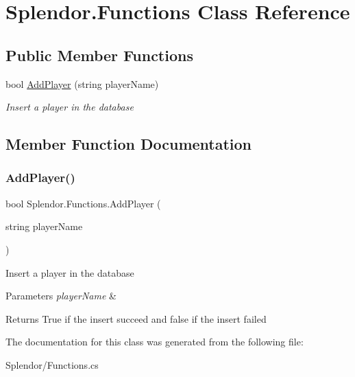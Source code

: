 \hypertarget{class_splendor_1_1_functions}{}\section{Splendor.\+Functions Class Reference}
\label{class_splendor_1_1_functions}
\subsection*{Public Member Functions}
\begin{DoxyCompactItemize}
\item 
bool \hyperlink{class_splendor_1_1_functions_a87095945323156b1266ee29b774c573d}{Add\+Player} (string player\+Name)
\begin{DoxyCompactList}\small\item\em Insert a player in the database \end{DoxyCompactList}\end{DoxyCompactItemize}


\subsection{Member Function Documentation}
\mbox{\label{class_splendor_1_1_functions_a87095945323156b1266ee29b774c573d}} 
\subsubsection{\texorpdfstring{Add\+Player()}{AddPlayer()}}
{\footnotesize\ttfamily bool Splendor.\+Functions.\+Add\+Player (\begin{DoxyParamCaption}\item[{string}]{player\+Name }\end{DoxyParamCaption})}



Insert a player in the database 


\begin{DoxyParams}{Parameters}
{\em player\+Name} & \\
\hline
\end{DoxyParams}
\begin{DoxyReturn}{Returns}
True if the insert succeed and false if the insert failed
\end{DoxyReturn}


The documentation for this class was generated from the following file\+:\begin{DoxyCompactItemize}
\item 
Splendor/Functions.\+cs\end{DoxyCompactItemize}
